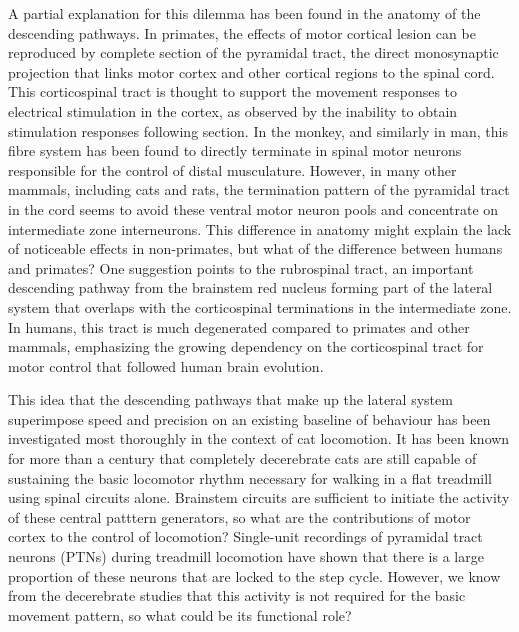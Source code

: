 A partial explanation for this dilemma has been found in the anatomy of the descending pathways. In primates, the effects of motor cortical lesion can be reproduced by complete section of the pyramidal tract, the direct monosynaptic projection that links motor cortex and other cortical regions to the spinal cord. This corticospinal tract is thought to support the movement responses to electrical stimulation in the cortex, as observed by the inability to obtain stimulation responses following section. In the monkey, and similarly in man, this fibre system has been found to directly terminate in spinal motor neurons responsible for the control of distal musculature. However, in many other mammals, including cats and rats, the termination pattern of the pyramidal tract in the cord seems to avoid these ventral motor neuron pools and concentrate on intermediate zone interneurons. This difference in anatomy might explain the lack of noticeable effects in non-primates, but what of the difference between humans and primates? One suggestion points to the rubrospinal tract, an important descending pathway from the brainstem red nucleus forming part of the lateral system that overlaps with the corticospinal terminations in the intermediate zone. In humans, this tract is much degenerated compared to primates and other mammals, emphasizing the growing dependency on the corticospinal tract for motor control that followed human brain evolution.

This idea that the descending pathways that make up the lateral system superimpose speed and precision on an existing baseline of behaviour has been investigated most thoroughly in the context of cat locomotion. It has been known for more than a century that completely decerebrate cats are still capable of sustaining the basic locomotor rhythm necessary for walking in a flat treadmill using spinal circuits alone. Brainstem circuits are sufficient to initiate the activity of these central patttern generators, so what are the contributions of motor cortex to the control of locomotion? Single-unit recordings of pyramidal tract neurons (PTNs) during treadmill locomotion have shown that there is a large proportion of these neurons that are locked to the step cycle. However, we know from the decerebrate studies that this activity is not required for the basic movement pattern, so what could be its functional role?

